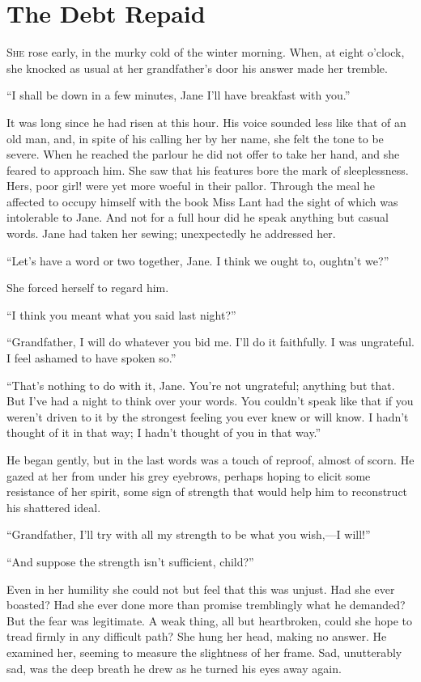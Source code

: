 \chapter{The Debt Repaid}

\textsc{She} rose early, in the murky cold of the winter morning. When,
at eight o'clock, she knocked as usual at her grandfather's door his
answer made her tremble.

``I shall be down in a few minutes, Jane I'll have breakfast with you.''

It was long since he had risen at this hour. His voice sounded less like
that of an old man, and, in spite of his calling her by her name, she
felt the tone to be severe. When he reached the parlour he did not offer
to take her hand, and she feared to approach him. She saw that his
features bore the mark of sleeplessness. Hers, poor girl! were yet more
woeful in their pallor. Through the meal he affected to occupy himself
with the book Miss Lant had {}the sight of which was intolerable to
Jane. And not for a full hour did he speak anything but casual words.
Jane had taken her sewing; unexpectedly he addressed her.

``Let's have a word or two together, Jane. I think we ought to, oughtn't
we?''

She forced herself to regard him.

``I think you meant what you said last night?''

``Grandfather, I will do whatever you bid me. I'll do it faithfully. I
was ungrateful. I feel ashamed to have spoken so.''

``That's nothing to do with it, Jane. You're not ungrateful; anything
but that. But I've had a night to think over your words. You couldn't
speak like that if you weren't driven to it by the strongest feeling you
ever knew or will know. I hadn't thought of it in that way; I hadn't
thought of you in that way.''

He began gently, but in the last words was a touch of reproof, almost of
scorn. He gazed at her from under his grey eyebrows, perhaps hoping to
elicit some resistance of her spirit, some sign of strength that would
help him to reconstruct his shattered ideal.

{}``Grandfather, I'll try with all my strength to be what you wish,---I
will!''

``And suppose the strength isn't sufficient, child?''

Even in her humility she could not but feel that this was unjust. Had
she ever boasted? Had she ever done more than promise tremblingly what
he demanded? But the fear was legitimate. A weak thing, all but
heartbroken, could she hope to tread firmly in any difficult path? She
hung her head, making no answer. He examined her, seeming to measure the
slightness of her frame. Sad, unutterably sad, was the deep breath he
drew as he turned his eyes away again.

